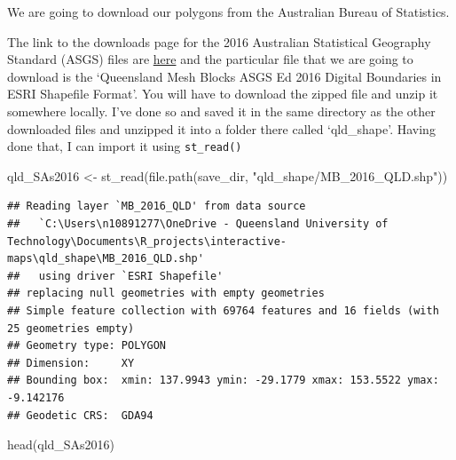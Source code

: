 \documentclass[
]{book}
\newenvironment{Shaded}{\begin{snugshade}}{\end{snugshade}}
\newcommand{\FunctionTok}[1]{\textcolor[rgb]{0.00,0.00,0.00}{#1}}
\newcommand{\NormalTok}[1]{#1}
\newcommand{\OtherTok}[1]{\textcolor[rgb]{0.56,0.35,0.01}{#1}}
\newcommand{\StringTok}[1]{\textcolor[rgb]{0.31,0.60,0.02}{#1}}
\begin{document}
We are going to download our polygons from the Australian Bureau of Statistics.

The link to the downloads page for the 2016 Australian Statistical Geography Standard (ASGS) files are \href{https://www.abs.gov.au/AUSSTATS/abs@.nsf/DetailsPage/1270.0.55.001July\%202016?OpenDocument}{here} and the particular file that we are going to download is the `Queensland Mesh Blocks ASGS Ed 2016 Digital Boundaries in ESRI Shapefile Format'.
You will have to download the zipped file and unzip it somewhere locally. I've done so and saved it in the same directory as the other downloaded files and unzipped it into a folder there called `qld\_shape'. Having done that, I can import it using \texttt{st\_read()}

\begin{Shaded}
\begin{Highlighting}[]
\NormalTok{qld\_SAs2016 }\OtherTok{\textless{}{-}} \FunctionTok{st\_read}\NormalTok{(}\FunctionTok{file.path}\NormalTok{(save\_dir, }\StringTok{"qld\_shape/MB\_2016\_QLD.shp"}\NormalTok{))}
\end{Highlighting}
\end{Shaded}

\begin{verbatim}
## Reading layer `MB_2016_QLD' from data source 
##   `C:\Users\n10891277\OneDrive - Queensland University of Technology\Documents\R_projects\interactive-maps\qld_shape\MB_2016_QLD.shp' 
##   using driver `ESRI Shapefile'
## replacing null geometries with empty geometries
## Simple feature collection with 69764 features and 16 fields (with 25 geometries empty)
## Geometry type: POLYGON
## Dimension:     XY
## Bounding box:  xmin: 137.9943 ymin: -29.1779 xmax: 153.5522 ymax: -9.142176
## Geodetic CRS:  GDA94
\end{verbatim}

\begin{Shaded}
\begin{Highlighting}[]
\FunctionTok{head}\NormalTok{(qld\_SAs2016)}
\end{Highlighting}
\end{Shaded}
\end{document}
